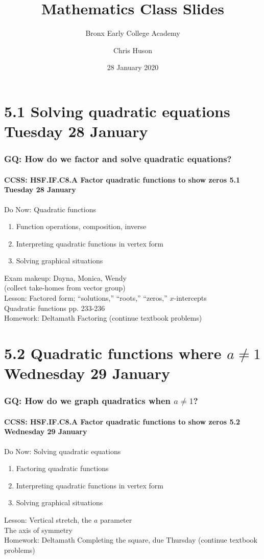 \documentclass{beamer}
\title{Mathematics Class Slides}
\subtitle{Bronx Early College Academy}
\author{Chris Huson}
\date{28 January 2020}
\begin{document}
\frame{\titlepage}
\section[Outline]{}
\frame{\tableofcontents}

\section{5.1 Solving quadratic equations \hfill Tuesday 28 January}
\frame
{
  \frametitle{GQ: How do we factor and solve quadratic equations?}
  \framesubtitle{CCSS: HSF.IF.C8.A Factor quadratic functions to show zeros \hfill \alert{5.1 Tuesday 28 January}}

  \begin{block}{Do Now: Quadratic functions}
    \begin{enumerate}
      \item Function operations, composition, inverse
      \item Interpreting quadratic functions in vertex form
      \item Solving graphical situations
    \end{enumerate}
    \end{block}
    Exam makeup: Dayna, Monica, Wendy\\
    \qquad (collect take-homes from vector group)\\
    Lesson: Factored form; ``solutions,'' ``roots,'' ``zeros,'' $x$-intercepts\\
    \qquad Quadratic functions pp. 233-236 \\ \smallskip
    Homework: Deltamath Factoring (continue textbook problems)
    }

\section{5.2 Quadratic functions where $a \neq 1$ \hfill Wednesday 29 January}
\frame
{
  \frametitle{GQ: How do we graph quadratics when $a \neq 1$?}
  \framesubtitle{CCSS: HSF.IF.C8.A Factor quadratic functions to show zeros \hfill \alert{5.2 Wednesday 29 January}}

  \begin{block}{Do Now: Solving quadratic equations}
    \begin{enumerate}
      \item Factoring quadratic functions
      \item Interpreting quadratic functions in vertex form
      \item Solving graphical situations
    \end{enumerate}
    \end{block}
    Lesson: Vertical stretch, the $a$ parameter\\
    \qquad The axis of symmetry \\ \smallskip
    Homework: Deltamath Completing the square, due Thursday (continue textbook problems)
    }
\end{document}
